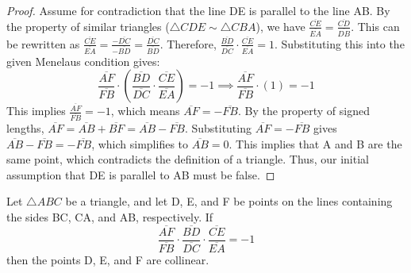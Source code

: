 \begin{proof}
    Assume for contradiction that the line DE is parallel to the line AB. By the property of similar triangles ($\triangle CDE \sim \triangle CBA$), we have $\frac{\overline{CE}}{\overline{EA}} = \frac{\overline{CD}}{\overline{DB}}$.
    This can be rewritten as $\frac{\overline{CE}}{\overline{EA}} = \frac{-\overline{DC}}{-\overline{BD}} = \frac{\overline{DC}}{\overline{BD}}$.
    Therefore, $\frac{\overline{BD}}{\overline{DC}} \cdot \frac{\overline{CE}}{\overline{EA}} = 1$.
    Substituting this into the given Menelaus condition gives:
    $$ \frac{\overline{AF}}{\overline{FB}} \cdot \left( \frac{\overline{BD}}{\overline{DC}} \cdot \frac{\overline{CE}}{\overline{EA}} \right) = -1 \implies \frac{\overline{AF}}{\overline{FB}} \cdot (1) = -1 $$
    This implies $\frac{\overline{AF}}{\overline{FB}} = -1$, which means $\overline{AF} = -\overline{FB}$. By the property of signed lengths, $\overline{AF} = \overline{AB} + \overline{BF} = \overline{AB} - \overline{FB}$.
    Substituting $\overline{AF} = -\overline{FB}$ gives $\overline{AB} - \overline{FB} = -\overline{FB}$, which simplifies to $\overline{AB} = 0$. This implies that A and B are the same point, which contradicts the definition of a triangle.
    Thus, our initial assumption that DE is parallel to AB must be false.
\end{proof}

\begin{theorem}
    \label{thm:Converse_of_Menelaus}
    Let $\triangle ABC$ be a triangle, and let D, E, and F be points on the lines containing the sides BC, CA, and AB, respectively. If
    $$ \frac{\overline{AF}}{\overline{FB}} \cdot \frac{\overline{BD}}{\overline{DC}} \cdot \frac{\overline{CE}}{\overline{EA}} = -1 $$
    then the points D, E, and F are collinear.
\end{theorem}

